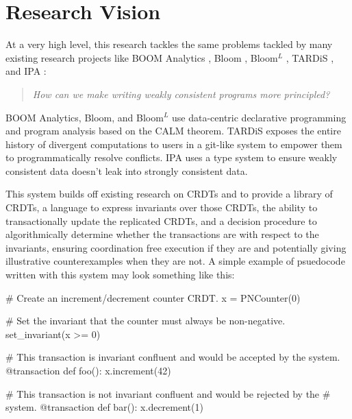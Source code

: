 \section{Research Vision}

At a very high level, this research tackles the same problems tackled by many
existing research projects like BOOM Analytics \cite{alvaro2010boom}, Bloom
\cite{alvaro2011consistency}, Bloom$^L$ \cite{conway2012logic}, TARDiS
\cite{crookstardis}, and IPA \cite{holt2016disciplined}:

\begin{quotation}
  \emph{How can we make writing weakly consistent programs more principled?}
\end{quotation}

BOOM Analytics, Bloom, and Bloom$^L$ use data-centric declarative programming
and program analysis based on the CALM theorem. TARDiS exposes the entire
history of divergent computations to users in a git-like system to empower them
to programmatically resolve conflicts. IPA uses a type system to ensure weakly
consistent data doesn't leak into strongly consistent data.

\begin{todoitemize}
  \item {}
  \item {}
\end{todoitemize}

This system builds off existing research on CRDTs and \iconfluence{} to provide
a library of CRDTs, a language to express invariants over those CRDTs, the
ability to transactionally update the replicated CRDTs, and a decision
procedure to algorithmically determine whether the transactions are
\iconfluent{} with respect to the invariants, ensuring coordination free
execution if they are and potentially giving illustrative counterexamples when
they are not. A simple example of psuedocode written with this system may look
something like this:

\begin{Python}
# Create an increment/decrement counter CRDT.
x = PNCounter(0)

# Set the invariant that the counter must always be non-negative.
set_invariant(x >= 0)

# This transaction is invariant confluent and would be accepted by the system.
@transaction
def foo():
  x.increment(42)

# This transaction is not invariant confluent and would be rejected by the
# system.
@transaction
def bar():
  x.decrement(1)
\end{Python}

